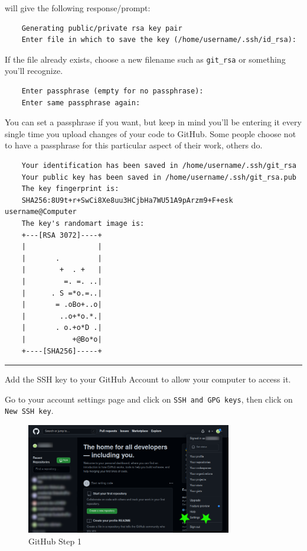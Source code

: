 will give the following response/prompt:

\begin{verbatim}
    Generating public/private rsa key pair
    Enter file in which to save the key (/home/username/.ssh/id_rsa): 
\end{verbatim}

If the file already exists, choose a new filename such as
\texttt{git\_rsa} or something you'll recognize.

\begin{verbatim}
    Enter passphrase (empty for no passphrase): 
    Enter same passphrase again: 
\end{verbatim}

You can set a passphrase if you want, but keep in mind you'll be
entering it every single time you upload changes of your code to GitHub.
Some people choose not to have a passphrase for this particular aspect
of their work, others do.

\begin{verbatim}
    Your identification has been saved in /home/username/.ssh/git_rsa
    Your public key has been saved in /home/username/.ssh/git_rsa.pub
    The key fingerprint is:
    SHA256:8U9t+r+SwCi8Xe8uu3HCjbHa7WU51A9pArzm9+F+esk username@Computer
    The key's randomart image is:
    +---[RSA 3072]----+
    |                 |
    |       .         |
    |        +  . +   |
    |         =. =. ..|
    |      . S =*o.=..|
    |       = .oBo+..o|
    |        ..o+*o.*.|
    |       . o.+o*D .|
    |           +@Bo*o|
    +----[SHA256]-----+
\end{verbatim}
\begin{center}\rule{0.5\linewidth}{0.5pt}\end{center}
Add the SSH key to your GitHub Account to allow your computer to access
it.

Go to your account settings page and click on
\texttt{SSH\ and\ GPG\ keys}, then click on \texttt{New\ SSH\ key}.

\begin{figure}
\centering
\includegraphics[width=0.8\textwidth]{Images/GH_01.png}
\caption{GitHub Step 1}
\end{figure}
\FloatBarrier


